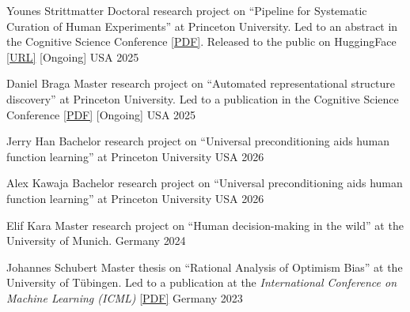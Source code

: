 \begin{cvhonors}
    \cvhonor
    {Younes Strittmatter} %
    {Doctoral research project on ``Pipeline for Systematic Curation of Human Experiments'' at Princeton University. Led to an abstract in the Cognitive Science Conference \href{https://drive.google.com/file/d/1fIvK43MxyiOtc13B7JDwyvzfzIulutVA/view?usp=sharing}{[PDF]}. Released to the public on HuggingFace  \href{https://huggingface.co/psyche-org}{[URL]} [Ongoing]}  %
    {USA} %
    {2025} %

    \cvhonor
    {Daniel Braga} %
    {Master research project on ``Automated representational structure discovery'' at Princeton University. Led to a publication in the Cognitive Science Conference  \href{https://drive.google.com/file/d/1NQ0tgUqLk8KDsJfXqCQgLiGnnDbjQ50X/view?usp=sharing}{[PDF]} [Ongoing]} %
    {USA} %
    {2025} %
    
\cvhonor
    {Jerry Han} %
    {Bachelor research project on ``Universal preconditioning aids human function learning'' at Princeton University} %
    {USA} %
    {2026} %

  \cvhonor
    {Alex Kawaja} %
    {Bachelor research project on ``Universal preconditioning aids human function learning'' at Princeton University} %
    {USA} %
    {2026} %
    
  \cvhonor
    {Elif Kara} %
    {Master research project on ``Human decision-making in the wild'' at the University of Munich.} %
    {Germany} %
    {2024} %

  \cvhonor
    {Johannes Schubert} %
    {Master thesis on ``Rational Analysis of Optimism Bias'' at the University of Tübingen. Led to a publication at the \textit{International Conference on Machine Learning (ICML)} \href{https://arxiv.org/pdf/2402.03969.pdf}{[PDF]}} %
    {Germany} %
    {2023} %
    \vspace{3mm}
\end{cvhonors}
